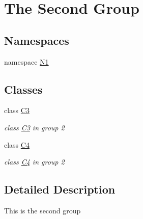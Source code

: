 \hypertarget{group__group2}{\section{The Second Group}
\label{group__group2}
}
\subsection*{Namespaces}
\begin{DoxyCompactItemize}
\item 
namespace \hyperlink{namespace_n1}{N1}
\end{DoxyCompactItemize}
\subsection*{Classes}
\begin{DoxyCompactItemize}
\item 
class \hyperlink{class_c3}{C3}
\begin{DoxyCompactList}\small\item\em class \hyperlink{class_c3}{C3} in group 2 \end{DoxyCompactList}\item 
class \hyperlink{class_c4}{C4}
\begin{DoxyCompactList}\small\item\em class \hyperlink{class_c4}{C4} in group 2 \end{DoxyCompactList}\end{DoxyCompactItemize}


\subsection{Detailed Description}
This is the second group 